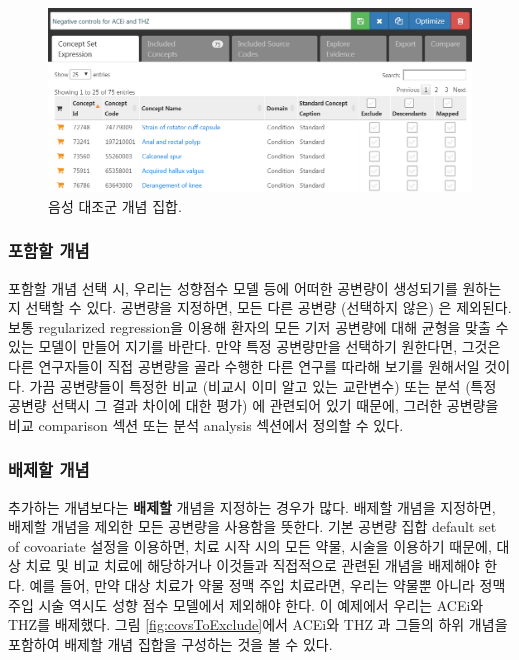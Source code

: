 \documentclass[11pt]{book}
\theoremstyle{definition}
\theoremstyle{definition}
\theoremstyle{definition}
\theoremstyle{remark}
\begin{document}
\begin{figure}

{\centering \includegraphics[width=1\linewidth]{images/PopulationLevelEstimation/ncConceptSet} 

}

\caption{음성 대조군 개념 집합.}\label{fig:ncConceptSet}
\end{figure}

\subsubsection*{포함할 개념}\label{-}

포함할 개념 선택 시, 우리는 성향점수 모델 등에 어떠한 공변량이
생성되기를 원하는지 선택할 수 있다. 공변량을 지정하면, 모든 다른 공변량
(선택하지 않은) 은 제외된다. 보통 regularized regression을 이용해 환자의
모든 기저 공변량에 대해 균형을 맞출 수 있는 모델이 만들어 지기를 바란다.
만약 특정 공변량만을 선택하기 원한다면, 그것은 다른 연구자들이 직접
공변량을 골라 수행한 다른 연구를 따라해 보기를 원해서일 것이다. 가끔
공변량들이 특정한 비교 (비교시 이미 알고 있는 교란변수) 또는 분석 (특정
공변량 선택시 그 결과 차이에 대한 평가) 에 관련되어 있기 때문에, 그러한
공변량을 비교 comparison 섹션 또는 분석 analysis 섹션에서 정의할 수
있다.

\subsubsection*{배제할 개념}\label{-}

추가하는 개념보다는 \textbf{배제할} 개념을 지정하는 경우가 많다. 배제할
개념을 지정하면, 배제할 개념을 제외한 모든 공변량을 사용함을 뜻한다.
기본 공변량 집합 default set of covoariate 설정을 이용하면, 치료 시작
시의 모든 약물, 시술을 이용하기 때문에, 대상 치료 및 비교 치료에
해당하거나 이것들과 직접적으로 관련된 개념을 배제해야 한다. 예를 들어,
만약 대상 치료가 약물 정맥 주입 치료라면, 우리는 약물뿐 아니라 정맥 주입
시술 역시도 성향 점수 모델에서 제외해야 한다. 이 예제에서 우리는 ACEi와
THZ를 배제했다. 그림 \ref{fig:covsToExclude}에서 ACEi와 THZ 과 그들의
하위 개념을 포함하여 배제할 개념 집합을 구성하는 것을 볼 수 있다.
\end{document}
